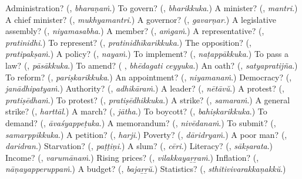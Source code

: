 \begin{tcolorbox}[breakable,colback=teal!4,colframe=teal!35!black,title={Before you move on}]
Administration? (\textbf{}, \emph{bharaṇaṁ}.) To govern? (\textbf{}, \emph{bharikkuka}.) A minister? (\textbf{}, \emph{mantri}.) A chief minister? (\textbf{}, \emph{mukhyamantri}.) A governor? (\textbf{}, \emph{gavarṇar}.) A legislative assembly? (\textbf{}, \emph{niyamasabha}.) A member? (\textbf{}, \emph{aṁgaṁ}.) A representative? (\textbf{}, \emph{pratinidhi}.) To represent? (\textbf{}, \emph{pratinidhīkarikkuka}.) The opposition? (\textbf{}, \emph{pratipakṣaṁ}.) A policy? (\textbf{}, \emph{nayaṁ}.) To implement? (\textbf{}, \emph{naṭappākkuka}.) To pass a law? (\textbf{}, \emph{pāsākkuka}.) To amend? (\textbf{ }, \emph{bhēdagati ceyyuka}.) An oath? (\textbf{}, \emph{satyapratijña}.) To reform? (\textbf{}, \emph{pariṣkarikkuka}.) An appointment? (\textbf{}, \emph{niyamanaṁ}.) Democracy? (\textbf{}, \emph{janādhipatyaṁ}.) Authority? (\textbf{}, \emph{adhikāraṁ}.) A leader? (\textbf{}, \emph{nētāvŭ}.) A protest? (\textbf{}, \emph{pratiṣēdhaṁ}.) To protest? (\textbf{}, \emph{pratiṣēdhikkuka}.) A strike? (\textbf{}, \emph{samaraṁ}.) A general strike? (\textbf{}, \emph{harttāl}.) A march? (\textbf{}, \emph{jātha}.) To boycott? (\textbf{}, \emph{bahiṣkarikkuka}.) To demand? (\textbf{}, \emph{āvaśyappeṭuka}.) A memorandum? (\textbf{}, \emph{nivēdanaṁ}.) To submit? (\textbf{}, \emph{samarppikkuka}.) A petition? (\textbf{}, \emph{harji}.) Poverty? (\textbf{}, \emph{dāridryaṁ}.) A poor man? (\textbf{}, \emph{daridran}.) Starvation? (\textbf{}, \emph{paṭṭiṇi}.) A slum? (\textbf{}, \emph{cēri}.) Literacy? (\textbf{}, \emph{sākṣarata}.) Income? (\textbf{}, \emph{varumānaṁ}.) Rising prices? (\textbf{}, \emph{vilakkayaṟṟaṁ}.) Inflation? (\textbf{}, \emph{nāṇayapperuppaṁ}.) A budget? (\textbf{}, \emph{bajaṟṟŭ}.) Statistics? (\textbf{}, \emph{sthitivivarakkaṇakkŭ}.)
\end{tcolorbox}
